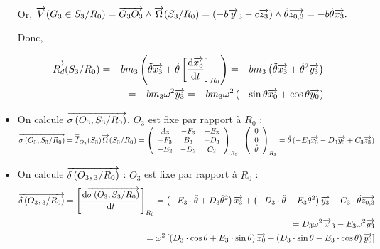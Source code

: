 \documentclass[10pt,fleqn]{article} %
\begin{document}
\begin{exemple}
\begin{itemize}
Or, 
$
\overrightarrow{V}(G_3\in S_3/R_0)=\overrightarrow{G_3O_3}\wedge \overrightarrow{\Omega}(S_3/R_0)=
(-b \overrightarrow{y}_3-c \overrightarrow{z_3})\wedge \dot{\theta} \overrightarrow{z_{0,3}}
=-b \dot{\theta} \overrightarrow{x_3}.
$

Donc,

\begin{align*}
\overrightarrow{R_d}(S_3/R_0)=-b m_3 \left(\ddot{\theta} \overrightarrow{x_3}+\dot{\theta} \left[\frac{\text{d}  \overrightarrow{x_3}}{\text{d} t}\right]_{R_0}\right)
=-b m_3 \left(\ddot{\theta} \overrightarrow{x_3}+\dot{\theta}^2 \overrightarrow{y_3}\right)\\
=-b m_3 \omega^2 \overrightarrow{y_3}=-b m_3 \omega^2\left(-\sin\theta \overrightarrow{x_0}+\cos\theta \overrightarrow{y_0}\right)
\end{align*}


\item On calcule $\overrightarrow{\sigma \left( {O_3}, {S_3} /{R_0}\right)}$.
$O_3$ est fixe par rapport à $R_0$ : 
$
\overrightarrow{\sigma \left( {O_3}, {S_3} /{R_0}\right)}=\overline{\overline{I}}_{O_3}(S_3) \overrightarrow{\Omega}(S_3/R_0)
=\left(\begin{array}{ccc}
A_3 & -F_3 & -E_3 \\ 
-F_3 & B_3 & -D_3 \\ 
-E_3 & -D_3 & C_3
\end{array} \right)_{R_3}\cdot
\left(\begin{array}{c}
0 \\ 
0 \\ 
\dot{\theta}
\end{array} \right)_{R_3}
=\dot{\theta}\left(-E_3 \overrightarrow{x_3}-D_3 \overrightarrow{y_3}+C_3 \overrightarrow{z_3}\right)
$
\end{itemize}

\begin{itemize}
\item On calcule $\overrightarrow{\delta \left( {O_3}, {_3} /{R_0}\right)}$ : 
$O_3$ est fixe par rapport à $R_0$ : 
\begin{align*}
\overrightarrow{\delta \left( {O_3}, {_3} /{R_0}\right)}=\left[\frac{\text{d} \overrightarrow{\sigma \left( {O_3}, {S_3} /{R_0}\right)}}{\text{d} t}\right]_{R_0}
=
\left(-E_3\cdot\ddot{\theta}+D_3 \dot{\theta}^2\right) \overrightarrow{x_3}+\left(-D_3\cdot\ddot{\theta}-E_3 \dot{\theta}^2\right) \overrightarrow{y_3}+C_3\cdot\ddot{\theta} \overrightarrow{z_{0,3}}\\
=D_3 \omega^2 \overrightarrow{x}_3-E_3 \omega^2 \overrightarrow{y_3}\\
=\omega^2 \left[\left(D_3\cdot\cos\theta+E_3\cdot\sin\theta\right) \overrightarrow{x_0}+\left(D_3\cdot\sin\theta-E_3\cdot\cos\theta\right) \overrightarrow{y_0}\right]
\end{align*}


\end{itemize}
\end{exemple}
\end{document}
